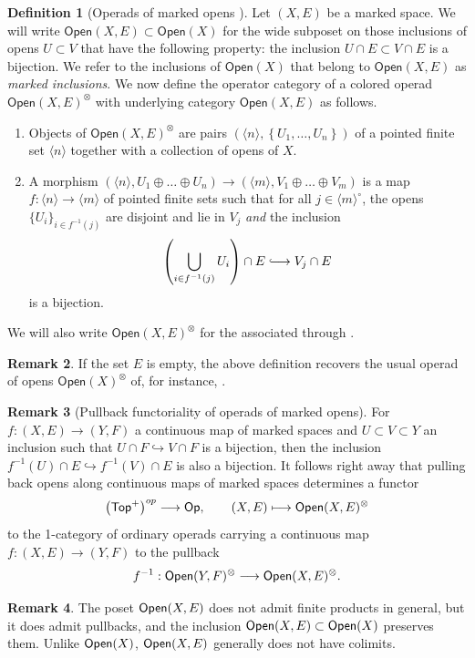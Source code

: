 \documentclass[10pt, reqno, twoside
, final
]{amsart}
\numberwithin{equation}{subsection}%
\theoremstyle{definition}
\newtheorem{defn}{Definition}[subsection]
\theoremstyle{definition}
\theoremstyle{definition}
\theoremstyle{definition}
\theoremstyle{definition}
\theoremstyle{definition}
\theoremstyle{definition}
\theoremstyle{definition}
\theoremstyle{definition}
\theoremstyle{plain}
\theoremstyle{definition}
\theoremstyle{plain}
\theoremstyle{definition}
\theoremstyle{plain}
\theoremstyle{definition}
\newtheorem{rmk}[defn]{Remark}
\theoremstyle{definition}
\theoremstyle{plain}
\theoremstyle{plain}
\theoremstyle{definition}
\theoremstyle{plain}
\theoremstyle{plain}
\theoremstyle{plain}
\begin{document}
\begin{defn}[Operads of marked opens \cite{Karlssonthesis}]
Let $(X,E)$ be a marked space. We will write $\mathsf{Open}(X,E)\subset\mathsf{Open}(X)$ for the wide subposet on those inclusions of opens $U\subset V$ that have the following property: the inclusion $U \cap E\subset V\cap E$ is a bijection. We refer to the inclusions of $\mathsf{Open}(X)$ that belong to $\mathsf{Open}(X,E)$ as \emph{marked inclusions}. We now define the operator category of a colored operad $\mathsf{Open}(X,E)^{\otimes}$ with underlying category $\mathsf{Open}(X,E)$ as follows. 
\begin{enumerate}
    \item[$(O)$] Objects of $\mathsf{Open}(X,E)^{\otimes}$ are pairs $\left(\langle n\rangle, \left\{U_1,\ldots,U_n\right\}\right)$ of a pointed finite set $\langle n\rangle$ together with a collection of opens of $X$.
    \item[$(M)$] A morphism $\left(\langle n\rangle, U_1\oplus\ldots \oplus U_n\right)\rightarrow\left(\langle m\rangle,V_1\oplus\ldots \oplus V_m\right)$ is a map $f:\langle n\rangle \rightarrow \langle m\rangle$ of pointed finite sets such that for all $j\in \langle m\rangle^{\circ}$, the opens $\{U_i\}_{i\in f^{-1}(j)}$ are disjoint and lie in $V_j$ \emph{and} the inclusion 
    \[  \left( \bigcup_{i\in f^{-1}(j)}U_i \right) \cap E  \hooklongrightarrow V_j \cap E \]
    is a bijection.
\end{enumerate}
We will also write $\mathsf{Open}(X,E)^{\otimes}$ for the associated \infop through \cite[Definition 2.1.1.23]{LurHA}. 
\end{defn}
\begin{rmk}
If the set $E$ is empty, the above definition recovers the usual operad of opens $\mathsf{Open}(X)^{\otimes}$ of, for instance, \cite[Definition 5.5.2.1]{LurHA}.    
\end{rmk}
\begin{rmk}[Pullback functoriality of operads of marked opens]\label{rmk:functormarkedopens}
For $f:(X,E)\rightarrow (Y,F)$ a continuous map of marked spaces and $U\subset V\subset Y$ an inclusion such that $U\cap F\hookrightarrow V\cap F $ is a bijection, then the inclusion $f^{-1}(U)\cap E\hookrightarrow f^{-1}(V)\cap E$ is also a bijection. It follows right away that pulling back opens along continuous maps of marked spaces determines a functor 
\[  \left(\mathsf{Top}^+\right)^{op} \longrightarrow \mathsf{Op},\quad\quad (X,E)\longmapsto \mathsf{Open}(X,E)^{\otimes} \]
to the 1-category of ordinary operads carrying a continuous map $f:(X,E)\rightarrow (Y,F)$ to the pullback 
\[ f^{-1}:\mathsf{Open}(Y,F)^{\otimes}\longrightarrow\mathsf{Open}(X,E)^{\otimes}. \]    
\end{rmk}
\begin{rmk}
The poset $\mathsf{Open}(X,E)$ does not admit finite products in general, but it does admit pullbacks, and the inclusion $\mathsf{Open}(X,E)\subset \mathsf{Open}(X)$ preserves them. Unlike $\mathsf{Open}(X)$, $\mathsf{Open}(X,E)$ generally does not have colimits.
\end{rmk}
\end{document}

